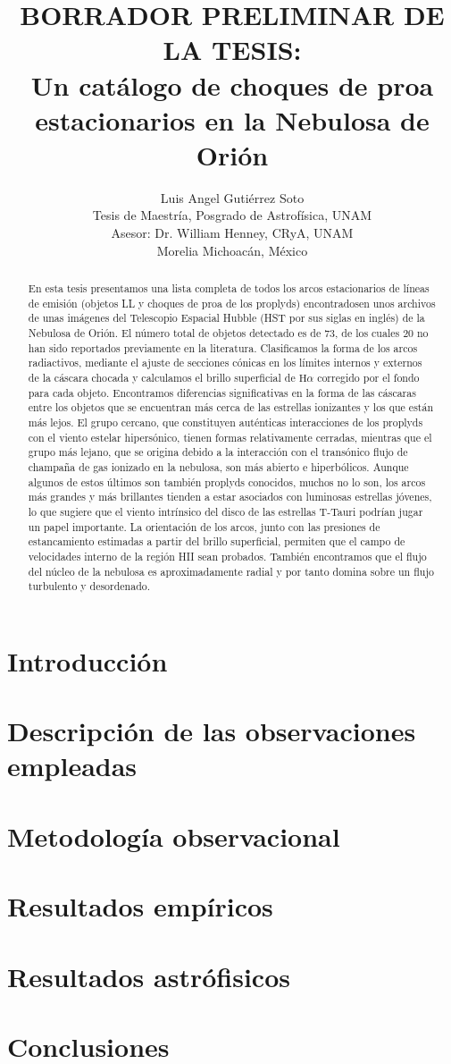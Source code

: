 \documentclass{report}
\title{BORRADOR PRELIMINAR DE LA TESIS:\\
Un catálogo de choques de proa estacionarios en la Nebulosa de Orión}
\author{
  Luis Angel Gutiérrez Soto\\
  Tesis de Maestría, Posgrado de Astrofísica, UNAM\\
  Asesor: Dr. William Henney, CRyA, UNAM\\
  Morelia Michoacán, México
  }
\newcommand\ha{\ensuremath{\mathrm{H}\alpha}}
\begin{document}
\maketitle

\tableofcontents

\begin{abstract}
En esta tesis presentamos una lista completa de todos los arcos estacionarios de líneas de emisión (objetos LL y choques de proa de los proplyds) encontradosen unos archivos de unas imágenes  del Telescopio Espacial Hubble (HST por sus siglas en inglés) de la Nebulosa de Orión. El número total de objetos detectado es de 73, de los cuales 20 no han sido reportados previamente en la literatura. Clasificamos la forma de los arcos radiactivos, mediante el ajuste de secciones cónicas en los límites internos y externos de la cáscara chocada y calculamos el brillo superficial de \ha{} corregido por el fondo para cada objeto. Encontramos diferencias significativas en la forma de las cáscaras entre los objetos que se encuentran más cerca de las estrellas ionizantes y los que están más lejos. El grupo cercano, que constituyen auténticas interacciones de los proplyds con el viento estelar hipersónico, tienen formas relativamente cerradas, mientras que el grupo más lejano, que se origina debido a la interacción con el transónico flujo de champaña de gas ionizado en la nebulosa, son más abierto e hiperbólicos. Aunque algunos de estos últimos son también proplyds conocidos, muchos no lo son, los arcos más grandes y más brillantes tienden a estar asociados con luminosas estrellas jóvenes, lo que sugiere que el viento intrínsico del disco de las estrellas T-Tauri podrían jugar un papel importante. La orientación de los arcos, junto con las presiones de estancamiento estimadas a partir del brillo superficial, permiten que el campo de velocidades interno de la región HII sean probados. También  encontramos que el flujo del núcleo de la nebulosa es aproximadamente radial y por tanto domina sobre un flujo turbulento y desordenado.
\end{abstract}


\chapter{Introducción}

\chapter{Descripción de las observaciones empleadas}

\chapter{Metodología observacional}

\chapter{Resultados empíricos}

\chapter{Resultados astrófisicos}

\chapter{Conclusiones}



\end{document}
